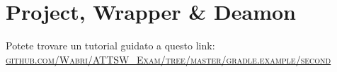 \section{Project, Wrapper \& Deamon}
Potete trovare un tutorial guidato a questo link: \href{https://github.com/Wabri/ATTSW_Exam/tree/master/gradle.example/second}{\textsc{github.com/Wabri/ATTSW\_Exam/tree/master/gradle.example/second}}







